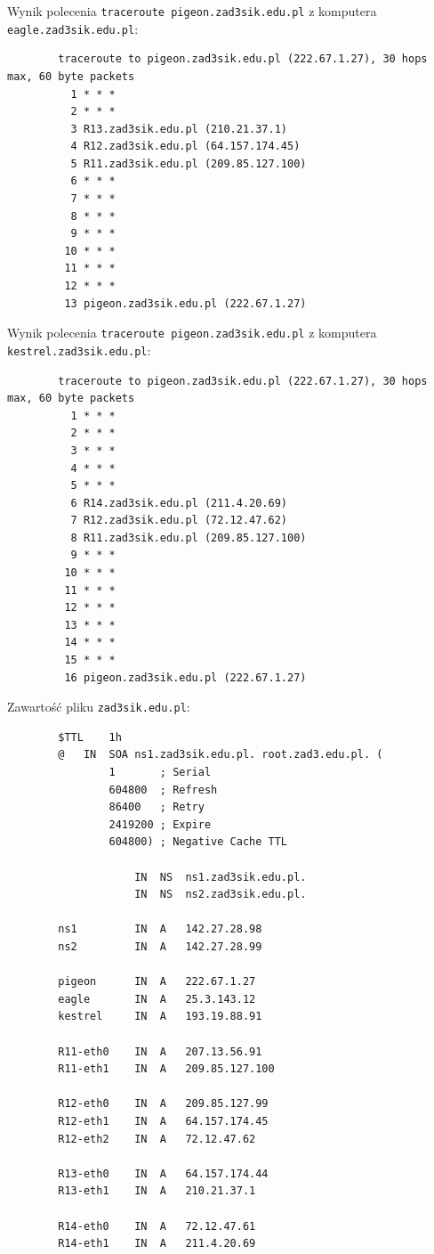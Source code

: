 \documentclass[12pt]{article}
\begin{document}
	\medskip
	
	Wynik polecenia \texttt{traceroute pigeon.zad3sik.edu.pl} z komputera
	\texttt{eagle.zad3sik.edu.pl}:
	\begin{verbatim}
		traceroute to pigeon.zad3sik.edu.pl (222.67.1.27), 30 hops max, 60 byte packets
		  1 * * *
		  2 * * *
		  3 R13.zad3sik.edu.pl (210.21.37.1)
		  4 R12.zad3sik.edu.pl (64.157.174.45)
		  5 R11.zad3sik.edu.pl (209.85.127.100)
		  6 * * *
		  7 * * *
		  8 * * *
		  9 * * *
		 10 * * *
		 11 * * *
		 12 * * *
		 13 pigeon.zad3sik.edu.pl (222.67.1.27)
	\end{verbatim}
	
	\medskip
	
	Wynik polecenia \texttt{traceroute pigeon.zad3sik.edu.pl} z komputera
	\texttt{kestrel.zad3sik.edu.pl}:
	\begin{verbatim}
		traceroute to pigeon.zad3sik.edu.pl (222.67.1.27), 30 hops max, 60 byte packets
		  1 * * *
		  2 * * *
		  3 * * *
		  4 * * *
		  5 * * *
		  6 R14.zad3sik.edu.pl (211.4.20.69)
		  7 R12.zad3sik.edu.pl (72.12.47.62)
		  8 R11.zad3sik.edu.pl (209.85.127.100)
		  9 * * *
		 10 * * *
		 11 * * *
		 12 * * *
		 13 * * *
		 14 * * *
		 15 * * *
		 16 pigeon.zad3sik.edu.pl (222.67.1.27)
	\end{verbatim}
	
	\medskip
	
	Zawartość pliku \texttt{zad3sik.edu.pl}:
	\begin{verbatim}
		$TTL    1h
		@   IN  SOA ns1.zad3sik.edu.pl. root.zad3.edu.pl. (
		        1       ; Serial
		        604800  ; Refresh
		        86400   ; Retry
		        2419200 ; Expire
		        604800) ; Negative Cache TTL
		
		            IN  NS  ns1.zad3sik.edu.pl.
		            IN  NS  ns2.zad3sik.edu.pl.
		
		ns1         IN  A   142.27.28.98
		ns2         IN  A   142.27.28.99
		
		pigeon      IN  A   222.67.1.27
		eagle       IN  A   25.3.143.12
		kestrel     IN  A   193.19.88.91
		
		R11-eth0    IN  A   207.13.56.91
		R11-eth1    IN  A   209.85.127.100
		
		R12-eth0    IN  A   209.85.127.99
		R12-eth1    IN  A   64.157.174.45
		R12-eth2    IN  A   72.12.47.62
		
		R13-eth0    IN  A   64.157.174.44
		R13-eth1    IN  A   210.21.37.1
		
		R14-eth0    IN  A   72.12.47.61
		R14-eth1    IN  A   211.4.20.69
	\end{verbatim}
\end{document}
